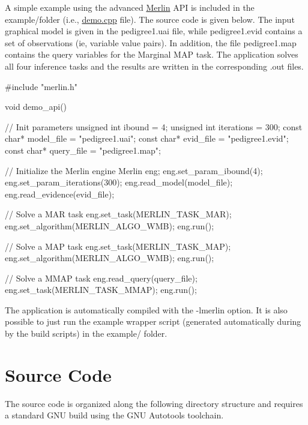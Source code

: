 A simple example using the advanced \hyperlink{classMerlin}{Merlin} A\+P\+I is included in the {\ttfamily example/}folder (i.\+e., {\ttfamily \hyperlink{demo_8cpp_source}{demo.\+cpp}} file). The source code is given below. The input graphical model is given in the {\ttfamily pedigree1.\+uai} file, while {\ttfamily pedigree1.\+evid} contains a set of observations (ie, variable value pairs). In addition, the file {\ttfamily pedigree1.\+map} contains the query variables for the Marginal M\+A\+P task. The application solves all four inference tasks and the results are written in the corresponding {\ttfamily .out} files. \begin{DoxyVerb}    #include "merlin.h"

    void demo_api() {

        // Init parameters
        unsigned int ibound = 4;
        unsigned int iterations = 300;
        const char* model_file = "pedigree1.uai";
        const char* evid_file = "pedigree1.evid";
        const char* query_file = "pedigree1.map";

        // Initialize the Merlin engine
        Merlin eng;
        eng.set_param_ibound(4);
        eng.set_param_iterations(300);
        eng.read_model(model_file);
        eng.read_evidence(evid_file);

        // Solve a MAR task
        eng.set_task(MERLIN_TASK_MAR);
        eng.set_algorithm(MERLIN_ALGO_WMB);
        eng.run();

        // Solve a MAP task
        eng.set_task(MERLIN_TASK_MAP);
        eng.set_algorithm(MERLIN_ALGO_WMB);
        eng.run();

        // Solve a MMAP task
        eng.read_query(query_file);
        eng.set_task(MERLIN_TASK_MMAP);
        eng.run();
    }
\end{DoxyVerb}


The application is automatically compiled with the {\ttfamily -\/lmerlin} option. It is also possible to just run the {\ttfamily example} wrapper script (generated automatically during by the build scripts) in the {\ttfamily example/} folder.

\section*{Source Code}

The source code is organized along the following directory structure and requires a standard G\+N\+U build using the G\+N\+U Autotools toolchain.


